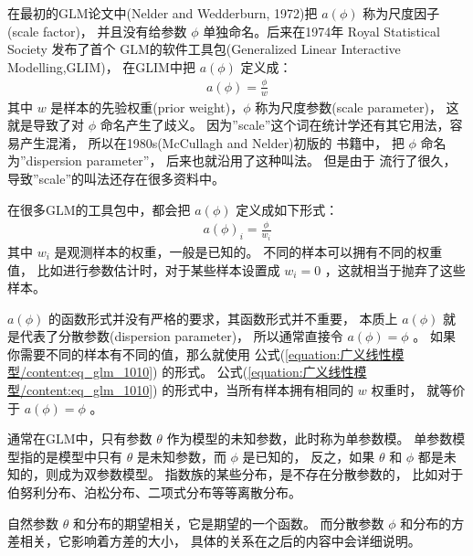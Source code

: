 \documentclass[letterpaper,10pt,english]{sphinxmanual}
\begin{document}
在最初的GLM论文中(Nelder and Wedderburn, 1972)把 \(a(\phi)\)
称为尺度因子(scale factor)， 并且没有给参数 \(\phi\)
单独命名。后来在1974年 Royal Statistical Society 发布了首个
GLM的软件工具包(Generalized Linear Interactive Modelling,GLIM)，
在GLIM中把 \(a(\phi)\) 定义成：
\begin{equation}\label{equation:广义线性模型/content:广义线性模型/content:3}
\begin{split}a(\phi) = \frac{\phi}{w}\end{split}
\end{equation}
其中 \(w\) 是样本的先验权重(prior weight)，\(\phi\)
称为尺度参数(scale parameter)，
这就是导致了对 \(\phi\) 命名产生了歧义。
因为”scale”这个词在统计学还有其它用法，容易产生混淆，
所以在1980s(McCullagh and Nelder)初版的  书籍中，
把 \(\phi\) 命名为”dispersion parameter”，
后来也就沿用了这种叫法。
但是由于  流行了很久，导致”scale”的叫法还存在很多资料中。

在很多GLM的工具包中，都会把 \(a(\phi)\) 定义成如下形式：
\begin{equation}\label{equation:广义线性模型/content:eq_glm_1010}
\begin{split}a(\phi)_i = \frac{\phi}{w_i}\end{split}
\end{equation}
其中 \(w_i\) 是观测样本的权重，一般是已知的。
不同的样本可以拥有不同的权重值，
比如进行参数估计时，对于某些样本设置成 \(w_i=0\)
，这就相当于抛弃了这些样本。

\(a(\phi)\) 的函数形式并没有严格的要求，其函数形式并不重要，
本质上 \(a(\phi)\) 就是代表了分散参数(dispersion parameter)，
所以通常直接令 \(a(\phi)=\phi\) 。
如果你需要不同的样本有不同的值，那么就使用 公式(\ref{equation:广义线性模型/content:eq_glm_1010}) 的形式。
公式(\ref{equation:广义线性模型/content:eq_glm_1010}) 的形式中，当所有样本拥有相同的 \(w\) 权重时，
就等价于 \(a(\phi)=\phi\) 。

通常在GLM中，只有参数 \(\theta\) 作为模型的未知参数，此时称为单参数模。
单参数模型指的是模型中只有 \(\theta\) 是未知参数，而 \(\phi\) 是已知的，
反之，如果 \(\theta\) 和 \(\phi\) 都是未知的，则成为双参数模型。
指数族的某些分布，是不存在分散参数的，
比如对于伯努利分布、泊松分布、二项式分布等等离散分布。

自然参数 \(\theta\) 和分布的期望相关，它是期望的一个函数。
而分散参数 \(\phi\) 和分布的方差相关，它影响着方差的大小，
具体的关系在之后的内容中会详细说明。

\end{document}
